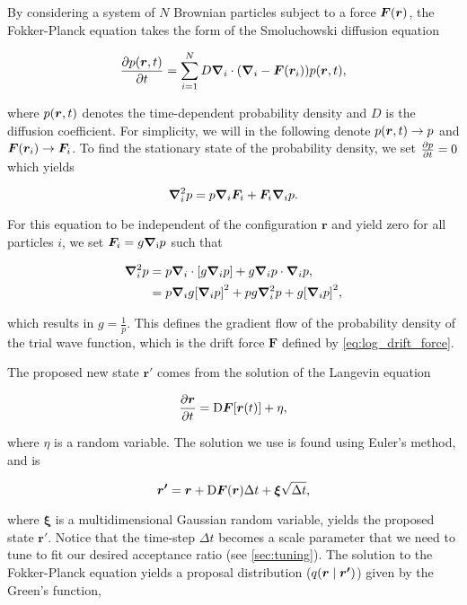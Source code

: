 By considering a system of $N$ Brownian particles subject to a force $\bm{F}\qty(\bm{r})$, the Fokker-Planck equation takes the form of the Smoluchowski diffusion equation

\begin{equation}
    \pdv{p \qty(\bm{r}, t)}{t} = \sum_{i=1}^N D \grad_i \cdot \qty(\grad_i - \bm{F}\qty(\bm{r}_i)) p \qty(\bm{r}, t),
\end{equation}

where $p \qty(\bm{r}, t)$ denotes the time-dependent probability density and $D$ is the diffusion coefficient. For simplicity, we will in the following denote $p \qty(\bm{r}, t) \to p$ and $\bm{F}\qty(\bm{r}_i) \to \bm{F}_i$. To find the stationary state of the probability density, we set $\pdv{p}{t} = 0$ which yields

\begin{equation*}
    \grad_i^2 p = p \grad_i \bm{F}_i + \bm{F}_i \grad_i p. 
\end{equation*}

For this equation to be independent of the configuration $\bm{r}$ and yield zero for all particles $i$, we set $\bm{F}_i = g\grad_{\mathrm{i}}p$ such that 

\begin{align*}
    \grad_i^2 p &= p \grad_i \cdot\qty[g\grad_i p] + g\grad_i p\cdot \grad_i p,
    \\
    &= p \grad_{i} g \qty[\grad_i p]^2 + p g \grad_i^2 p + g \qty[\grad_i p]^2, 
\end{align*} 

which results in $g=\frac{1}{p}$. This defines the gradient flow of the probability density of the trial wave function, which is the drift force $\bm{F}$ defined by \autoref{eq:log_drift_force}. 

The proposed new state $\bm{r'}$ comes from the solution of the Langevin equation 

\begin{equation}\label{eq:langevin}
    \pdv{\bm{r}}{t} = \mathrm{D}\bm{F}\qty[\bm{r}(t)] + \eta, 
\end{equation}

where $\eta$ is a random variable. The solution we use is found using Euler's method, and is 

\begin{equation}
    \bm{r'} = \bm{r} + \mathrm{D}\bm{F}\qty(\bm{r})\Delta t + \bm{\xi}\sqrt{\Delta t},
\end{equation}

where $\bm{\xi}$ is a multidimensional Gaussian random variable, yields the proposed state $\bm{r'}$. Notice that the time-step $\Delta t$ becomes a scale parameter that we need to tune to fit our desired acceptance ratio (see \autoref{sec:tuning}). The solution to the Fokker-Planck equation yields a proposal distribution ($q\qty(\bm{r}\mid\bm{r'})$) given by the Green's function,  

